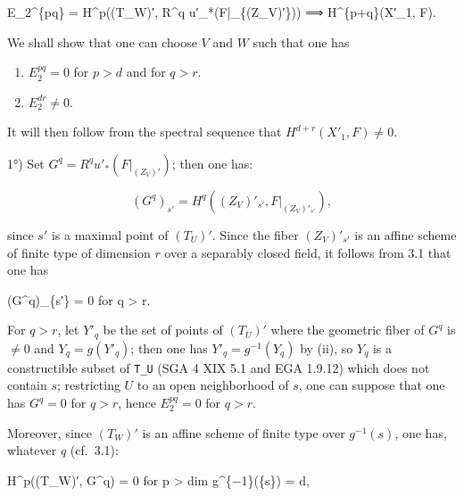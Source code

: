 \documentclass[
  11pt,
  a4paper,
]{book}
\newenvironment{Shaded}{}{}
\newcommand{\NormalTok}[1]{#1}
\begin{document}
\begin{Shaded}
\begin{Highlighting}[]
\NormalTok{E\_2\^{}\{pq\} = H\^{}p((T\_W)′, R\^{}q u′\_*(F|\_\{(Z\_V)′\})) ⟹ H\^{}\{p+q\}(X′\_1, F).}
\end{Highlighting}
\end{Shaded}

We shall show that one can choose \(V\) and \(W\) such that one has

\begin{enumerate}
\def\labelenumi{\alph{enumi})}
\item
  \(E^{pq}_{2} = 0\) for \(p > d\) and for \(q > r\).
\item
  \(E^{dr}_{2} \neq 0\).
\end{enumerate}

It will then follow from the spectral sequence that
\(H^{d+r}(X'_{1}, F) \neq 0\).

1°) Set \(G^{q} = R^{q} u'_{*}(F|_{(Z_{V})'})\); then one has:

\[ (G^{q})_{s'} = H^{q}((Z_{V})'_{s'}, F|_{(Z_{V})'_{s'}}), \]

since \(s'\) is a maximal point of \((T_{U})'\). Since the fiber
\((Z_{V})'_{s'}\) is an affine scheme of finite type of dimension \(r\)
over a separably closed field, it follows from 3.1 that one has

\begin{Shaded}
\begin{Highlighting}[]
\NormalTok{(G\^{}q)\_\{s′\} = 0 for q \textgreater{} r.}
\end{Highlighting}
\end{Shaded}

For \(q > r\), let \(Y'_{q}\) be the set of points of \((T_{U})'\) where
the geometric fiber of \(G^{q}\) is \(\neq 0\) and \(Y_{q}
= g(Y'_{q})\); then one has \(Y'_{q} = g^{-1}(Y_{q})\) by (ii), so
\(Y_{q}\) is a constructible subset of \texttt{T\_U} (SGA 4 XIX 5.1 and
EGA 1.9.12) which does not contain \(s\); restricting \(U\) to an open
neighborhood of \(s\), one can suppose that one has \(G^{q} = 0\) for
\(q > r\), hence \(E^{pq}_{2} = 0\) for \(q > r\).

Moreover, since \((T_{W})'\) is an affine scheme of finite type over
\(g^{-1}({s})\), one has, whatever \(q\) (cf.~3.1):

\begin{Shaded}
\begin{Highlighting}[]
\NormalTok{H\^{}p((T\_W)′, G\^{}q) = 0 for p \textgreater{} dim g\^{}\{−1\}(\{s\}) = d,}
\end{Highlighting}
\end{Shaded}
\end{document}
